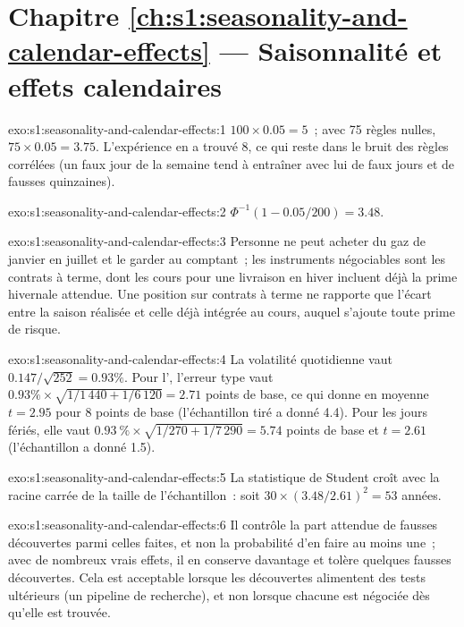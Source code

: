 \section*{Chapitre \ref{ch:s1:seasonality-and-calendar-effects} --- Saisonnalité et effets calendaires}

\begin{solution}{exo:s1:seasonality-and-calendar-effects:1}
$100 \times 0.05 = 5$~; avec 75 règles nulles, $75 \times 0.05 = 3.75$. L'expérience en a trouvé 8, ce qui reste dans le bruit des règles corrélées (un faux jour de la semaine
tend à entraîner avec lui de faux jours et de fausses quinzaines).
\end{solution}

\begin{solution}{exo:s1:seasonality-and-calendar-effects:2}
$\Phi^{-1}(1 - 0.05/200) = 3.48$.
\end{solution}

\begin{solution}{exo:s1:seasonality-and-calendar-effects:3}
Personne ne peut acheter du gaz de janvier en juillet et le garder au comptant~; les instruments négociables sont les contrats à terme, dont les cours pour une livraison en hiver incluent déjà la
prime hivernale attendue. Une position sur contrats à terme ne rapporte que l'écart entre la saison réalisée et celle déjà intégrée au cours, auquel s'ajoute toute prime de risque.
\end{solution}

\begin{solution}{exo:s1:seasonality-and-calendar-effects:4}
La volatilité quotidienne vaut $0.147/\sqrt{252} = 0.93\%$. Pour l', l'erreur type vaut $0.93\% \times \sqrt{1/1\,440 + 1/6\,120} = 2.71$ points
de base, ce qui donne en moyenne $t = 2.95$ pour 8 points de base (l'échantillon tiré a donné 4.4). Pour les jours fériés, elle vaut $0.93~\% \times \sqrt{1/270 + 1/7\,290} = 5.74$
points de base et $t = 2.61$ (l'échantillon a donné 1.5).
\end{solution}

\begin{solution}{exo:s1:seasonality-and-calendar-effects:5}
La statistique de Student croît avec la racine carrée de la taille de l'échantillon~: soit $30 \times (3.48/2.61)^2 = 53$ années.
\end{solution}

\begin{solution}{exo:s1:seasonality-and-calendar-effects:6}
Il contrôle la part attendue de fausses découvertes parmi celles faites, et non la probabilité d'en faire au moins une~; avec de nombreux vrais effets, il en conserve davantage et
tolère quelques fausses découvertes. Cela est acceptable lorsque les découvertes alimentent des tests ultérieurs (un pipeline de recherche), et non lorsque chacune est négociée dès qu'elle est trouvée.
\end{solution}

